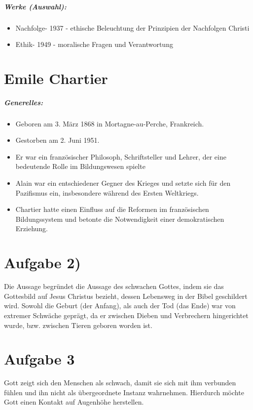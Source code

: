 \documentclass[11pt, a4paper]{report}
\begin{document}
	\paragraph{Werke (Auswahl):}
	\begin{itemize}
		\item \dq Nachfolge\dq - 1937 - ethische Beleuchtung der Prinzipien der Nachfolgen Christi
		\item \dq Ethik\dq - 1949 - moralische Fragen und Verantwortung
	\end{itemize}
	\chapter{Emile Chartier}
	\paragraph{Generelles:}
	\begin{itemize}
		\item Geboren am 3. M\"arz 1868 in Mortagne-au-Perche, Frankreich.
		\item Gestorben am 2. Juni 1951.
		\item Er war ein franz\"osischer Philosoph, Schriftsteller und Lehrer, der eine bedeutende Rolle im Bildungswesen spielte
		\item Alain war ein entschiedener Gegner des Krieges und setzte sich für den Pazifismus ein, insbesondere während des Ersten Weltkriegs.
		\item Chartier hatte einen Einfluss auf die Reformen im französischen Bildungssystem und betonte die Notwendigkeit einer demokratischen Erziehung.
	\end{itemize}
	\chapter{Aufgabe 2)}
	Die Aussage begründet die Aussage des schwachen Gottes, indem sie das Gottesbild auf Jesus Christus bezieht, dessen Lebensweg in der Bibel geschildert wird.
	Sowohl die Geburt (der Anfang), als auch der Tod (das Ende) war von extremer Schwäche gepr\"agt, da er zwischen Dieben und Verbrechern hingerichtet wurde, bzw. zwischen Tieren geboren worden ist.
	\chapter{Aufgabe 3}
	Gott zeigt sich den Menschen als schwach, damit sie sich mit ihm verbunden fühlen und ihn nicht als übergeordnete Instanz wahrnehmen.
	Hierdurch möchte Gott einen Kontakt auf Augenhöhe herstellen.
\end{document}
